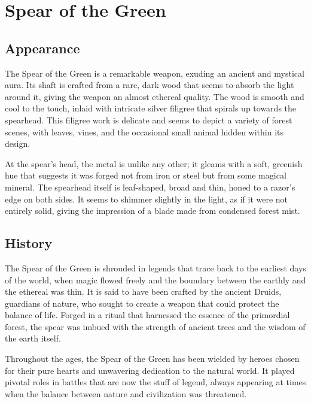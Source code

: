 
\chapter*{Spear of the Green}

\section*{Appearance}
The Spear of the Green is a remarkable weapon, exuding an ancient and mystical aura. Its shaft is crafted from a rare, dark wood that seems to absorb the light around it, giving the weapon an almost ethereal quality. The wood is smooth and cool to the touch, inlaid with intricate silver filigree that spirals up towards the spearhead. This filigree work is delicate and seems to depict a variety of forest scenes, with leaves, vines, and the occasional small animal hidden within its design.

At the spear's head, the metal is unlike any other; it gleams with a soft, greenish hue that suggests it was forged not from iron or steel but from some magical mineral. The spearhead itself is leaf-shaped, broad and thin, honed to a razor's edge on both sides. It seems to shimmer slightly in the light, as if it were not entirely solid, giving the impression of a blade made from condensed forest mist.

\section*{History}
The Spear of the Green is shrouded in legends that trace back to the earliest days of the world, when magic flowed freely and the boundary between the earthly and the ethereal was thin. It is said to have been crafted by the ancient Druids, guardians of nature, who sought to create a weapon that could protect the balance of life. Forged in a ritual that harnessed the essence of the primordial forest, the spear was imbued with the strength of ancient trees and the wisdom of the earth itself.

Throughout the ages, the Spear of the Green has been wielded by heroes chosen for their pure hearts and unwavering dedication to the natural world. It played pivotal roles in battles that are now the stuff of legend, always appearing at times when the balance between nature and civilization was threatened.

